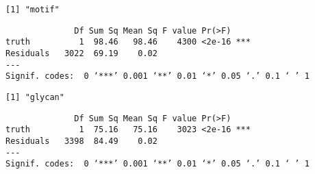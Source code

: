 \documentclass[11pt]{article}
\begin{document}
    \begin{Verbatim}[commandchars=\\\{\}]
[1] "motif"

    \end{Verbatim}

    
    \begin{verbatim}
              Df Sum Sq Mean Sq F value Pr(>F)    
truth          1  98.46   98.46    4300 <2e-16 ***
Residuals   3022  69.19    0.02                   
---
Signif. codes:  0 ‘***’ 0.001 ‘**’ 0.01 ‘*’ 0.05 ‘.’ 0.1 ‘ ’ 1
    \end{verbatim}

    
    \begin{Verbatim}[commandchars=\\\{\}]
[1] "glycan"

    \end{Verbatim}

    
    \begin{verbatim}
              Df Sum Sq Mean Sq F value Pr(>F)    
truth          1  75.16   75.16    3023 <2e-16 ***
Residuals   3398  84.49    0.02                   
---
Signif. codes:  0 ‘***’ 0.001 ‘**’ 0.01 ‘*’ 0.05 ‘.’ 0.1 ‘ ’ 1
    \end{verbatim}

    
    \begin{center}
    \end{center}
    { \hspace*{\fill} \\}
    
\end{document}
